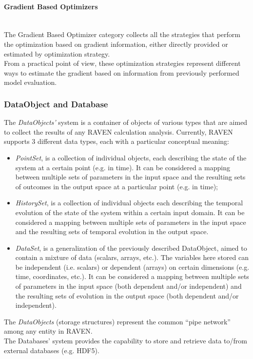 \paragraph{Gradient Based Optimizers} ~\\
The Gradient Based Optimizer category collects all the strategies that perform the optimization based on gradient 
information, either directly provided or estimated by optimization strategy.
\\From a practical point of view, these optimization strategies represent different ways to estimate the gradient based on 
information from previously performed model evaluation.

\subsubsection{DataObject and Database}
The \textit{DataObjects'} system is a container of objects of various types that are aimed to collect the results of any RAVEN 
calculation analysis. Currently, RAVEN supports 3 different data types, each with a particular conceptual meaning:
     \begin{itemize}
        \item \textit{PointSet},  is a collection of individual objects, each describing the state of the system at a certain point 
        (e.g. in time). It can be considered a mapping between multiple sets of parameters in the input space and the resulting 
        sets of outcomes in the output space at a particular point (e.g. in time);
        \item \textit{HistorySet}, is a collection of individual objects each describing the temporal evolution of the state of the 
        system within a certain input domain. It can be considered a mapping between multiple sets of parameters in the input 
        space and the resulting sets of temporal evolution in the output space.
         \item \textit{DataSet}, is a generalization of the previously described DataObject, aimed to contain a mixture of data 
         (scalars, arrays, etc.). The variables here stored can be independent (i.e. scalars) or dependent (arrays) on certain 
         dimensions (e.g. time, coordinates, etc.). It can be considered a mapping between multiple sets of parameters in the 
         input space (both dependent and/or independent) and the resulting sets of evolution in the output space 
         (both dependent and/or independent).
     \end{itemize}
     The \textit{DataObjects}  (storage structures) represent the common ``pipe network'' among any entity in RAVEN.
\\ The Databases' system provides the capability to store and retrieve data to/from external databases (e.g. HDF5).


